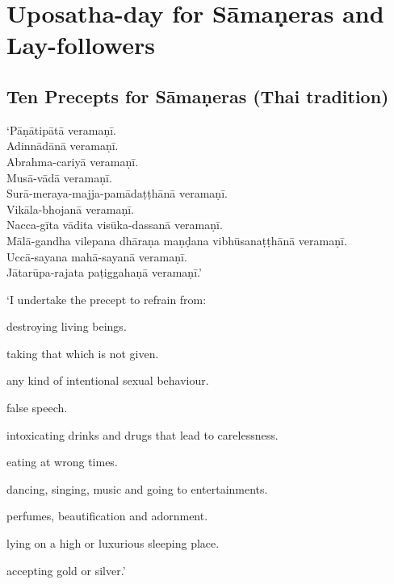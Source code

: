 \section{Uposatha-day for Sāmaṇeras and Lay-followers}

\subsection{Ten Precepts for Sāmaṇeras (Thai tradition)}


‘Pāṇātipātā veramaṇī.\\
Adinnādānā veramaṇī.\\
Abrahma-cariyā veramaṇī.\\
Musā-vādā veramaṇī.\\
Surā-meraya-majja-pamādaṭṭhānā veramaṇī.\\
Vikāla-bhojanā veramaṇī.\\
Nacca-gīta vādita visūka-dassanā veramaṇī.\\
Mālā-gandha vilepana dhāraṇa maṇḍana vibhūsanaṭṭhānā veramaṇī.\\
Uccā-sayana mahā-sayanā veramaṇī.\\
Jātarūpa-rajata paṭiggahaṇā veramaṇī.’

{\itshape

‘I undertake the precept to refrain from:

\begin{packeditemize}

\item destroying living beings.
\item taking that which is not given.
\item any kind of intentional sexual behaviour.
\item false speech.
\item intoxicating drinks and drugs that lead to carelessness.
\item eating at wrong times.
\item dancing, singing, music and going to entertainments.
\item perfumes, beautification and adornment.
\item lying on a high or luxurious sleeping place.
\item accepting gold or silver.’

\end{packeditemize}

}

